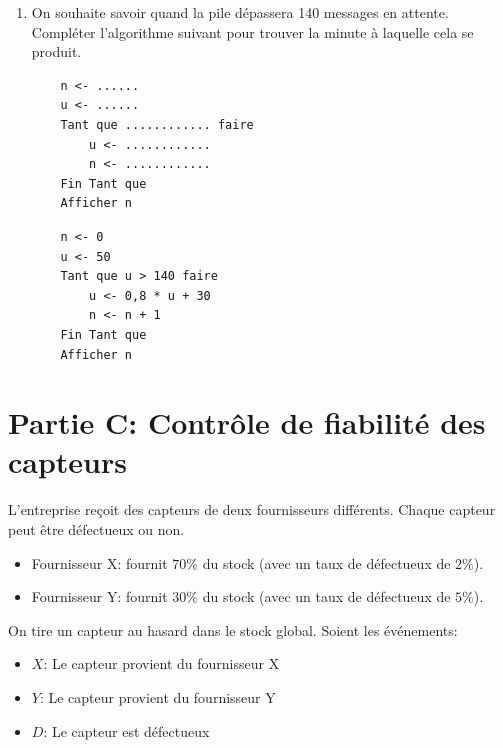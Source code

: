 \documentclass[11pt, a4paper]{report}
\begin{document}
\begin{enumerate}[resume]
    \medskip

    \item On souhaite savoir quand la pile dépassera 140 messages en attente. Compléter l'algorithme suivant pour trouver la minute à laquelle cela se produit. 
    
    \begin{minipage}[t]{0.48\linewidth}
        \bigskip
    \begin{verbatim}
    n <- ......
    u <- ......
    Tant que ............ faire
        u <- ............
        n <- ............
    Fin Tant que
    Afficher n
    \end{verbatim}
        
    \end{minipage}\hfill
    \begin{minipage}[t]{0.48\linewidth}
        \smallskip
            \begin{blocvisible}[height=4.5]
\begin{lstlisting}
    n <- 0
    u <- 50
    Tant que u > 140 faire
        u <- 0,8 * u + 30
        n <- n + 1
    Fin Tant que
    Afficher n
     \end{lstlisting}
    \end{blocvisible}
    \end{minipage}

\end{enumerate}


\pagebreak


\section*{Partie C\@: Contrôle de fiabilité des capteurs}

L'entreprise reçoit des capteurs de deux fournisseurs différents. Chaque capteur peut être défectueux ou non.

\begin{itemize}
    \item Fournisseur X\@: fournit $70 \%$ du stock (avec un taux de défectueux de $2 \%$).
    \item Fournisseur Y\@: fournit $30 \%$ du stock (avec un taux de défectueux de $5 \%$).
\end{itemize}

On tire un capteur au hasard dans le stock global. Soient les événements:

\begin{itemize}
    \item $X$: \og{}Le capteur provient du fournisseur X\fg{}
    \item $Y$: \og{}Le capteur provient du fournisseur Y\fg{}
    \item $D$: \og{}Le capteur est défectueux\fg{}
\end{itemize}
\end{document}
